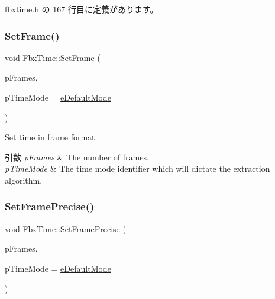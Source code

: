  fbxtime.\+h の 167 行目に定義があります。

\mbox{\label{class_fbx_time_ac695b38f72d522f8d592404b6f301fe4}} 
\subsubsection{\texorpdfstring{Set\+Frame()}{SetFrame()}}
{\footnotesize\ttfamily void Fbx\+Time\+::\+Set\+Frame (\begin{DoxyParamCaption}\item[{\hyperlink{fbxtypes_8h_ac34da60c22b0a7e1156e5480da7d71f1}{Fbx\+Long\+Long}}]{p\+Frames,  }\item[{\hyperlink{class_fbx_time_acc529b00a0e8d4c3da3702449ca93031}{E\+Mode}}]{p\+Time\+Mode = {\ttfamily \hyperlink{class_fbx_time_acc529b00a0e8d4c3da3702449ca93031a1490a2efc4429bf125761d75f2aa06a6}{e\+Default\+Mode}} }\end{DoxyParamCaption})}

Set time in frame format. 
\begin{DoxyParams}{引数}
{\em p\+Frames} & The number of frames. \\
\hline
{\em p\+Time\+Mode} & The time mode identifier which will dictate the extraction algorithm. \\
\hline
\end{DoxyParams}
\mbox{\label{class_fbx_time_aab76f3007f42dbeb80fc552c9e4175be}} 
\subsubsection{\texorpdfstring{Set\+Frame\+Precise()}{SetFramePrecise()}}
{\footnotesize\ttfamily void Fbx\+Time\+::\+Set\+Frame\+Precise (\begin{DoxyParamCaption}\item[{\hyperlink{fbxtypes_8h_a171e72a1c46fc15c1a6c9c31948c1c5b}{Fbx\+Double}}]{p\+Frames,  }\item[{\hyperlink{class_fbx_time_acc529b00a0e8d4c3da3702449ca93031}{E\+Mode}}]{p\+Time\+Mode = {\ttfamily \hyperlink{class_fbx_time_acc529b00a0e8d4c3da3702449ca93031a1490a2efc4429bf125761d75f2aa06a6}{e\+Default\+Mode}} }\end{DoxyParamCaption})}

